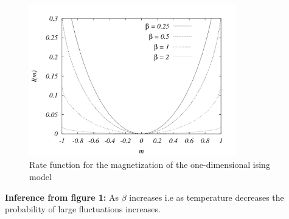\documentclass[letterpaper,english,10pt]{article}
\begin{document}
\begin{figure}
    \centering
    \includegraphics[width = 0.8\textwidth]{rate_fn.png}
    \caption{Rate function for the magnetization of the one-dimensional ising model}
\end{figure}
\begin{flushleft}
\textbf{Inference from figure 1: }As $\beta$ increases i.e as temperature decreases the probability of large fluctuations increases.
\end{flushleft}
\end{document}
